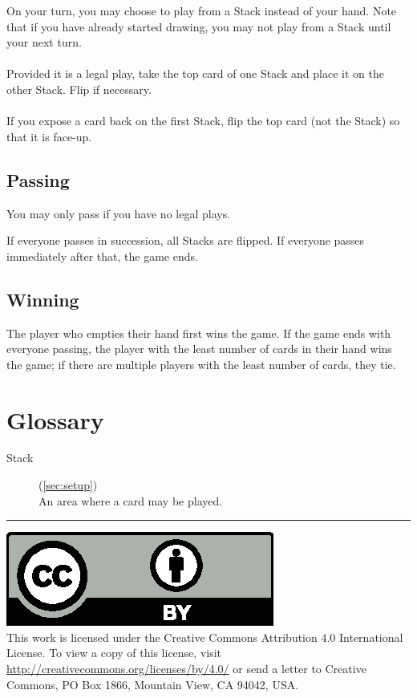 \documentclass{article}
\begin{document}
On your turn, you may choose to play from a Stack instead of your hand. Note that if you have already started drawing, you may not play from a Stack until your next turn.

\paragraph{}
Provided it is a legal play, take the top card of one Stack and place it on the other Stack. Flip if necessary.

\paragraph{}
If you expose a card back on the first Stack, flip the top card (not the Stack) so that it is face-up.

\subsection{Passing}

You may only pass if you have no legal plays.

If everyone passes in succession, all Stacks are flipped. If everyone passes immediately after that, the game ends.

\subsection{Winning}

The player who empties their hand first wins the game. If the game ends with everyone passing, the player with the least number of cards in their hand wins the game; if there are multiple players with the least number of cards, they tie.

\section{Glossary}
\begin{description}
  \item[Stack] (\autoref{sec:setup})\\
    An area where a card may be played.
\end{description}

\medskip
\hrule

{
  \small
  \includegraphics[scale=0.5]{cc-by.eps}\\
  This work is licensed under the Creative Commons Attribution 4.0
  International License. To view a copy of this license, visit
  \url{http://creativecommons.org/licenses/by/4.0/} or send a letter to Creative Commons, PO Box 1866, Mountain View, CA 94042, USA.
}
\end{document}

